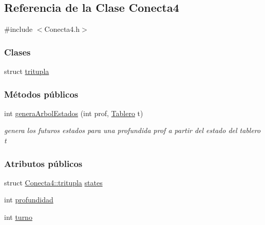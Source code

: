 \hypertarget{classConecta4}{}\subsection{Referencia de la Clase Conecta4}
\label{classConecta4}


{\ttfamily \#include $<$Conecta4.\+h$>$}

\subsubsection*{Clases}
\begin{DoxyCompactItemize}
\item 
struct \hyperlink{structConecta4_1_1tritupla}{tritupla}
\end{DoxyCompactItemize}
\subsubsection*{Métodos públicos}
\begin{DoxyCompactItemize}
\item 
int \hyperlink{classConecta4_ab72f5bb472cb8784cddb0b4b09c13dac}{genera\+Arbol\+Estados} (int prof, \hyperlink{classTablero}{Tablero} t)
\begin{DoxyCompactList}\small\item\em genera los futuros estados para una profundida prof a partir del estado del tablero t \end{DoxyCompactList}\end{DoxyCompactItemize}
\subsubsection*{Atributos públicos}
\begin{DoxyCompactItemize}
\item 
struct \hyperlink{structConecta4_1_1tritupla}{Conecta4\+::tritupla} \hyperlink{classConecta4_a4b4ec9e600e539e8f9863a978f45a95f}{states}
\item 
int \hyperlink{classConecta4_aabdb9394582c5f280d4a9c4593c53a9b}{profundidad}
\item 
int \hyperlink{classConecta4_aa26fd11095863677ff31ec9b5811fc09}{turno}
\end{DoxyCompactItemize}
